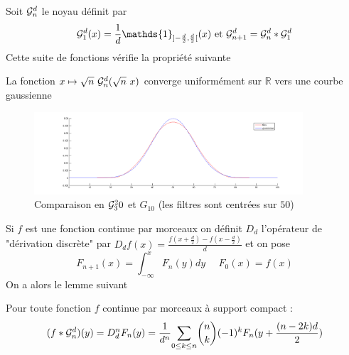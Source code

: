 Soit $\mathcal{G}_n^d$ le noyau définit par 
\begin{equation*}
\Gcal_1^d(x)=\frac{1}{d}\mathds{1}_{]-\frac{d}{2},\frac{d}{2}[}(x) \text{ et } \Gcal_{n+1}^d= \Gcal_n^d * \Gcal_1^d 
\label{formule_convol_n_int}
\end{equation*}
Cette suite de fonctions vérifie la propriété suivante
\begin{prop}
La fonction $x\mapsto \sqrt{n}~\mathcal{G}_n^d(\sqrt{n}~x)$ converge uniformément sur $\mathbb{R}$ vers une courbe gaussienne 
\end{prop}
\begin{figure}
\centering
\includegraphics[width=10cm]{filtre_g3.png}
\caption{Comparaison en $\mathcal{G}_3^20$ et $G_10$ (les filtres sont centrées sur $50$)}
\end{figure}
Si $f$ est une fonction continue par morceaux on définit $D_d$ l'opérateur de "dérivation discrète" par $D_d f(x)=\frac{f(x+\frac{d}{2})-f(x-\frac{d}{2})}{d}$  et on pose
\begin{equation*}
F_{n+1}(x)= \int_{-\infty}^{x}F_{n}(y)dy~~~~~~F_{0}(x)= f(x)
\end{equation*}
On a alors le lemme suivant 
\begin{prop} Pour toute fonction $f$ continue par morceaux à support compact :
\begin{equation}
 (f*\mathcal{G}_n^d)(y)=D_d^n F_{n}(y)= \frac{1}{d^n}\underset{0 \le k\le n}{\sum} \binom{n}{k}(-1)^{k} F_{n}(y+\frac{(n-2k)d}{2})
\end{equation}
\end{prop}
